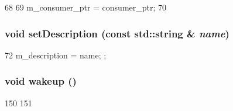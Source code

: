 \begin{DoxyCode}
68     {
69         m_consumer_ptr = consumer_ptr;
70     }
\end{DoxyCode}
\hypertarget{classWireBuffer_a9cdbe64eebafb111a124edec55ed2340}{
\subsubsection[{setDescription}]{\setlength{\rightskip}{0pt plus 5cm}void setDescription (const std::string \& {\em name})}}
\label{classWireBuffer_a9cdbe64eebafb111a124edec55ed2340}



\begin{DoxyCode}
72 { m_description = name; };
\end{DoxyCode}
\hypertarget{classWireBuffer_ae674290a26ecbd622c5160e38e8a4fe9}{
\subsubsection[{wakeup}]{\setlength{\rightskip}{0pt plus 5cm}void wakeup ()}}
\label{classWireBuffer_ae674290a26ecbd622c5160e38e8a4fe9}



\begin{DoxyCode}
150 {
151 }
\end{DoxyCode}


